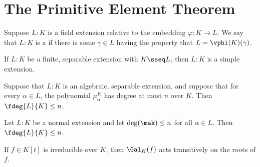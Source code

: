 \documentclass[a4paper]{article}
\begin{document}
\section{The Primitive Element Theorem}
\begin{tdefinition}
  Suppose $ L:K $ is a field extension relative to the embedding $ \varphi:K\to L $.
  We say that $ L:K $ is a  if there is some $ \gamma\in L $ having the property that $ L=\vphi(K)(\gamma) $.
\end{tdefinition}

\begin{ttheorem}
  If $ L:K $ be a finite, separable extension with $ K\sseq L $, then $ L:K $ is a simple extension.
\end{ttheorem}

\begin{tcorollary}
  Suppose that $ L:K $ is an algebraic, separable extension, and suppose that for every $ \alpha\in L $, the polynomial $ \mu_\alpha^K $ has degree at most $ n $ over $ K $.
  Then $ \fdeg{L}{K}\leq n $.
\end{tcorollary}

\quad Let \( L:K \) be a normal extension and let \( \deg(\mak)\leq n \) for all \( \alpha\in L \).
Then \( \fdeg{L}{K}\leq n \).

\begin{tcorollary}
  If \( f\in K[t] \) is irreducible over \( K \), then \( \Gal_K(f) \) acts transitively on the roots of \( f \).
\end{tcorollary}
\end{document}
